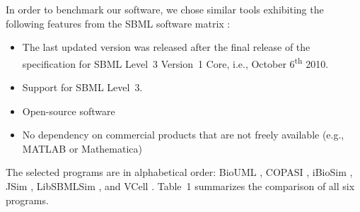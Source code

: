 \documentclass[10pt]{bmc_article}
\newenvironment{bmcformat}{\begin{raggedright}\baselineskip20pt\sloppy\setboolean{publ}{false}}{\end{raggedright}\baselineskip20pt\sloppy}
\begin{document}
\begin{bmcformat}
In order to benchmark our software, we chose similar tools exhibiting the
following features from the \acs{SBML} software
matrix :
%
%
\begin{itemize}
  \item The last updated version was released after the final release of
  the specification for \acs{SBML} Level~3 Version~1 Core, i.e., October
  6\textsuperscript{th} 2010.
  \item Support for \acs{SBML} Level~3.
  \item Open-source software
  \item No dependency on commercial products that are not freely available
  (e.g., MATLAB\texttrademark{} or Mathematica\texttrademark)
\end{itemize}
The selected programs are in alphabetical order:
BioUML \cite{Kolpakov2011}, COPASI \cite{Hoops2006}, 
iBioSim \cite{Myers2009}, JSim \cite{Raymond2003}, LibSBMLSim 
\cite{Takizawa2013}, and VCell \cite{Moraru2008}.
Table~1 summarizes the comparison of  all six
programs. 



\end{bmcformat}
\end{document}
